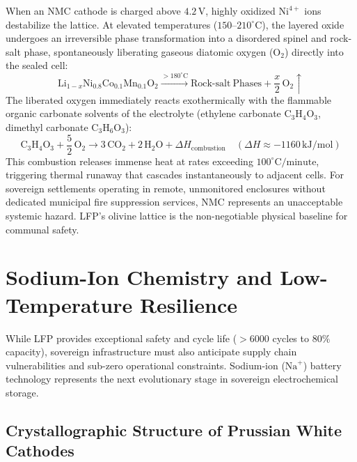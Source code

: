 When an NMC cathode is charged above $4.2\,\mathrm{V}$, highly oxidized $\mathrm{Ni}^{4+}$ ions destabilize the lattice. At elevated temperatures ($150$--$210^\circ\mathrm{C}$), the layered oxide undergoes an irreversible phase transformation into a disordered spinel and rock-salt phase, spontaneously liberating gaseous diatomic oxygen ($\mathrm{O}_2$) directly into the sealed cell:
\begin{equation}
\mathrm{Li}_{1-x}\mathrm{Ni}_{0.8}\mathrm{Co}_{0.1}\mathrm{Mn}_{0.1}\mathrm{O}_2 \xrightarrow{>180^\circ\mathrm{C}} \mathrm{Rock\text{-}salt\ Phases} + \frac{x}{2}\,\mathrm{O}_2 \uparrow
\label{eq:nmc_oxygen_release}
\end{equation}
The liberated oxygen immediately reacts exothermically with the flammable organic carbonate solvents of the electrolyte (ethylene carbonate $\mathrm{C}_3\mathrm{H}_4\mathrm{O}_3$, dimethyl carbonate $\mathrm{C}_3\mathrm{H}_6\mathrm{O}_3$):
\begin{equation}
\mathrm{C}_3\mathrm{H}_4\mathrm{O}_3 + \frac{5}{2}\,\mathrm{O}_2 \longrightarrow 3\,\mathrm{CO}_2 + 2\,\mathrm{H}_2\mathrm{O} + \Delta H_{\mathrm{combustion}} \quad (\Delta H \approx -1160\,\mathrm{kJ/mol})
\label{eq:solvent_combustion}
\end{equation}
This combustion releases immense heat at rates exceeding $100^\circ\mathrm{C}/\mathrm{minute}$, triggering thermal runaway that cascades instantaneously to adjacent cells. For sovereign settlements operating in remote, unmonitored enclosures without dedicated municipal fire suppression services, NMC represents an unacceptable systemic hazard. LFP's olivine lattice is the non-negotiable physical baseline for communal safety.

\section{Sodium-Ion Chemistry and Low-Temperature Resilience}

While LFP provides exceptional safety and cycle life ($>6000$ cycles to $80\%$ capacity), sovereign infrastructure must also anticipate supply chain vulnerabilities and sub-zero operational constraints. Sodium-ion ($\mathrm{Na}^+$) battery technology represents the next evolutionary stage in sovereign electrochemical storage.

\subsection{Crystallographic Structure of Prussian White Cathodes}

